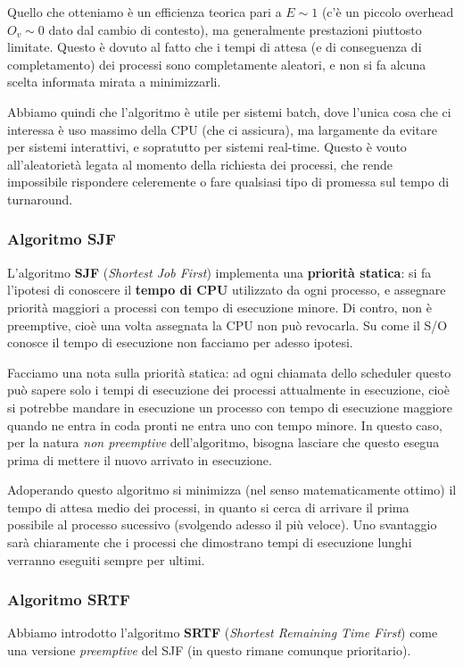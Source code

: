 \documentclass[a4paper,11pt]{article}
\begin{document}
Quello che otteniamo è un efficienza teorica pari a $E\sim1$ (c'è un piccolo overhead $O_v \sim 0$ dato dal cambio di contesto), ma generalmente prestazioni piuttosto limitate.
Questo è dovuto al fatto che i tempi di attesa (e di conseguenza di completamento) dei processi sono completamente aleatori, e non si fa alcuna scelta informata mirata a minimizzarli.

Abbiamo quindi che l'algoritmo è utile per sistemi batch, dove l'unica cosa che ci interessa è uso massimo della CPU (che ci assicura), ma largamente da evitare per sistemi interattivi, e sopratutto per sistemi real-time.
Questo è vouto all'aleatorietà legata al momento della richiesta dei processi, che rende impossibile rispondere celeremente o fare qualsiasi tipo di promessa sul tempo di turnaround. 

\subsubsection{Algoritmo SJF}
L'algoritmo \textbf{SJF} (\textit{Shortest Job First}) implementa una \textbf{priorità statica}: si fa l'ipotesi di conoscere il \textbf{tempo di CPU} utilizzato da ogni processo, e assegnare priorità maggiori a processi con tempo di esecuzione minore. Di contro, non è preemptive, cioè una volta assegnata la CPU non può revocarla. Su come il S/O conosce il tempo di esecuzione non facciamo per adesso ipotesi. 

Facciamo una nota sulla priorità statica: ad ogni chiamata dello scheduler questo può sapere solo i tempi di esecuzione dei processi attualmente in esecuzione, cioè si potrebbe mandare in esecuzione un processo con tempo di esecuzione maggiore quando ne entra in coda pronti ne entra uno con tempo minore. 
In questo caso, per la natura \textit{non preemptive} dell'algoritmo, bisogna lasciare che questo esegua prima di mettere il nuovo arrivato in esecuzione.

Adoperando questo algoritmo si minimizza (nel senso matematicamente ottimo) il tempo di attesa medio dei processi, in quanto si cerca di arrivare il prima possibile al processo sucessivo (svolgendo adesso il più veloce).
Uno svantaggio sarà chiaramente che i processi che dimostrano tempi di esecuzione lunghi verranno eseguiti sempre per ultimi.

\subsubsection{Algoritmo SRTF}
Abbiamo introdotto l'algoritmo \textbf{SRTF} (\textit{Shortest Remaining Time First}) come una versione \textit{preemptive} del SJF (in questo rimane comunque prioritario).
\end{document}
